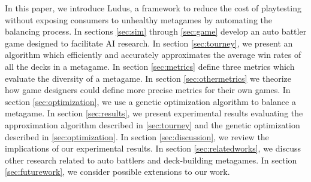 
In this paper, we introduce {\sc Ludus}, a framework to reduce the cost of playtesting without
exposing consumers to unhealthy metagames by automating the balancing
process. In sections \ref{sec:sim} through \ref{sec:game} develop an auto battler game designed to facilitate AI research. In
section \ref{sec:tourney}, we present an algorithm which efficiently
and accurately approximates the average win rates of all the decks in
a metagame. In section \ref{sec:metrics} define three metrics which
evaluate the diversity of a metagame. In section
\ref{sec:othermetrics} we theorize how game designers could define
more precise metrics for their own games. In section
\ref{sec:optimization}, we use a genetic optimization algorithm to
balance a metagame. In section \ref{sec:results}, we present
experimental results evaluating the approximation algorithm described
in \ref{sec:tourney} and the genetic optimization described in
\ref{sec:optimization}. In section \ref{sec:discussion}, we review the
implications of our experimental results. In section
\ref{sec:relatedworks}, we discuss other research related to auto
battlers and deck-building metagames. In section \ref{sec:futurework},
we consider possible extensions to our work.







